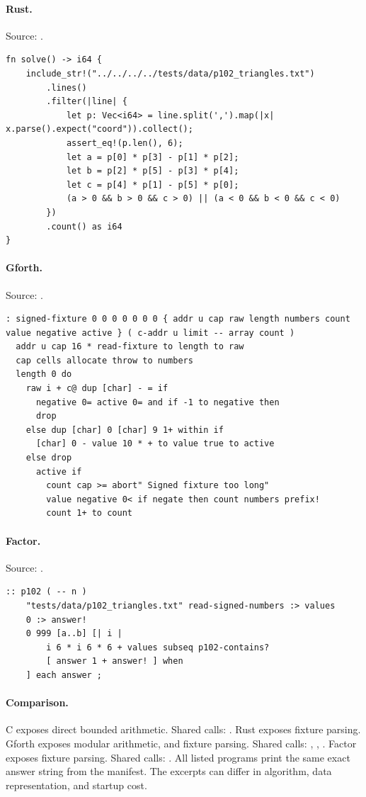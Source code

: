 \paragraph{Rust.} Source: .
\begin{lstlisting}
fn solve() -> i64 {
    include_str!("../../../../tests/data/p102_triangles.txt")
        .lines()
        .filter(|line| {
            let p: Vec<i64> = line.split(',').map(|x| x.parse().expect("coord")).collect();
            assert_eq!(p.len(), 6);
            let a = p[0] * p[3] - p[1] * p[2];
            let b = p[2] * p[5] - p[3] * p[4];
            let c = p[4] * p[1] - p[5] * p[0];
            (a > 0 && b > 0 && c > 0) || (a < 0 && b < 0 && c < 0)
        })
        .count() as i64
}
\end{lstlisting}

\paragraph{Gforth.} Source: .
\begin{lstlisting}
: signed-fixture 0 0 0 0 0 0 0 { addr u cap raw length numbers count value negative active } ( c-addr u limit -- array count )
  addr u cap 16 * read-fixture to length to raw
  cap cells allocate throw to numbers
  length 0 do
    raw i + c@ dup [char] - = if
      negative 0= active 0= and if -1 to negative then
      drop
    else dup [char] 0 [char] 9 1+ within if
      [char] 0 - value 10 * + to value true to active
    else drop
      active if
        count cap >= abort" Signed fixture too long"
        value negative 0< if negate then count numbers prefix!
        count 1+ to count
\end{lstlisting}

\paragraph{Factor.} Source: .
\begin{lstlisting}
:: p102 ( -- n )
    "tests/data/p102_triangles.txt" read-signed-numbers :> values
    0 :> answer!
    0 999 [a..b] [| i |
        i 6 * i 6 * 6 + values subseq p102-contains?
        [ answer 1 + answer! ] when
    ] each answer ;
\end{lstlisting}

\paragraph{Comparison.}
C exposes direct bounded arithmetic. Shared calls: \texttt{}. Rust exposes fixture parsing. Gforth exposes modular arithmetic, and fixture parsing. Shared calls: \texttt{}, \texttt{}, \texttt{}. Factor exposes fixture parsing. Shared calls: \texttt{}.
All listed programs print the same exact answer string from the manifest. The excerpts can differ in algorithm, data representation, and startup cost.

